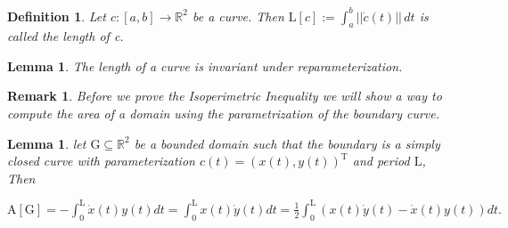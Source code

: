 \documentclass[a4paper]{book}
\newtheorem{lemma}[theorem]{Lemma}%
\newtheorem{remark}[theorem]{Remark}%
\newtheorem{definition}[theorem]{Definition}%
\numberwithin{theorem}{section}%
\begin{document}
\begin{definition}
    Let $c:[a,b]\to\mathbb{R}^2$ be a curve. Then $\mathrm{L}[c]:=\int_{a}^{b}||\dot{c}(t)||\,dt$ is called the length of c.
\end{definition}

\begin{lemma}
    The length of a curve is invariant under reparameterization.
\end{lemma}

\begin{remark}
    Before we prove the Isoperimetric Inequality we will show a way to compute the area of a domain using the parametrization of the boundary curve.
\end{remark}

\begin{lemma}
    let $\mathrm{G}\subseteq\mathbb{R}^{2}$ be a bounded domain such that the boundary is a simply closed curve with parameterization $c(t)=(x(t),y(t))^{\mathrm{T}}$ and period $\mathrm{L}$, Then
    \begin{center}
        $\mathrm{A}[\mathrm{G}]=-\int_0^{\mathrm{L}} \dot{x}(t) y(t) d t=\int_0^{\mathrm{L}} x(t) \dot{y}(t) d t=\frac{1}{2} \int_0^{\mathrm{L}}(x(t) \dot{y}(t)-\dot{x}(t) y(t)) d t .$
    \end{center}    
\end{lemma}
\end{document}

